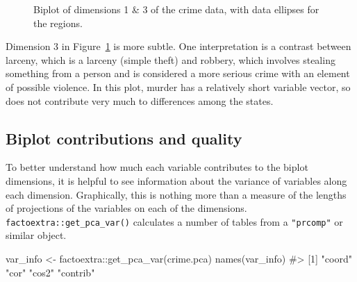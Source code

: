 \documentclass[
  letterpaper,
  10pt,
  krantz2]{krantz}
\makeatletter
\newenvironment{Shaded}{\begin{snugshade}}{\end{snugshade}}
\newcommand{\CommentTok}[1]{\textcolor[rgb]{0.37,0.37,0.37}{#1}}
\newcommand{\FunctionTok}[1]{\textcolor[rgb]{0.28,0.35,0.67}{#1}}
\newcommand{\NormalTok}[1]{\textcolor[rgb]{0.00,0.23,0.31}{#1}}
\newcommand{\OtherTok}[1]{\textcolor[rgb]{0.00,0.23,0.31}{#1}}
\newcommand{\SpecialCharTok}[1]{\textcolor[rgb]{0.37,0.37,0.37}{#1}}
\newenvironment{kframe}{%
  \medskip{}
  \setlength{\fboxsep}{.8em}
  \def\at@end@of@kframe{}%
  \ifinner\ifhmode%
  \def\at@end@of@kframe{\end{minipage}}%
  \begin{minipage}{\columnwidth}%
  \fi\fi%
  \def\FrameCommand##1{\hskip\@totalleftmargin \hskip-\fboxsep
  \colorbox{shadecolor}{##1}\hskip-\fboxsep
      \hskip-\linewidth \hskip-\@totalleftmargin \hskip\columnwidth}%
  \MakeFramed {\advance\hsize-\width
    \@totalleftmargin\z@ \linewidth\hsize
    \@setminipage}}%
{\par\unskip\endMakeFramed%
  \at@end@of@kframe}
\renewenvironment{Shaded}{\begin{kframe}}{\end{kframe}}
\makeatother
\begin{document}
\begin{figure}[H]


\caption{\label{fig-crime-biplot3}Biplot of dimensions 1 \& 3 of the
crime data, with data ellipses for the regions.}

\end{figure}%

Dimension 3 in Figure~\ref{fig-crime-biplot3} is more subtle. One
interpretation is a contrast between larceny, which is a larceny (simple
theft) and robbery, which involves stealing something from a person and
is considered a more serious crime with an element of possible violence.
In this plot, murder has a relatively short variable vector, so does not
contribute very much to differences among the states.

\subsection{Biplot contributions and
quality}\label{biplot-contributions-and-quality}

To better understand how much each variable contributes to the biplot
dimensions, it is helpful to see information about the variance of
variables along each dimension. Graphically, this is nothing more than a
measure of the lengths of projections of the variables on each of the
dimensions. \texttt{factoextra::get\_pca\_var()} calculates a number of
tables from a \texttt{"prcomp"} or similar object.

\begin{Shaded}
\begin{Highlighting}[]
\NormalTok{var\_info }\OtherTok{\textless{}{-}}\NormalTok{ factoextra}\SpecialCharTok{::}\FunctionTok{get\_pca\_var}\NormalTok{(crime.pca)}
\FunctionTok{names}\NormalTok{(var\_info)}
\CommentTok{\#\textgreater{} [1] "coord"   "cor"     "cos2"    "contrib"}
\end{Highlighting}
\end{Shaded}
\end{document}
